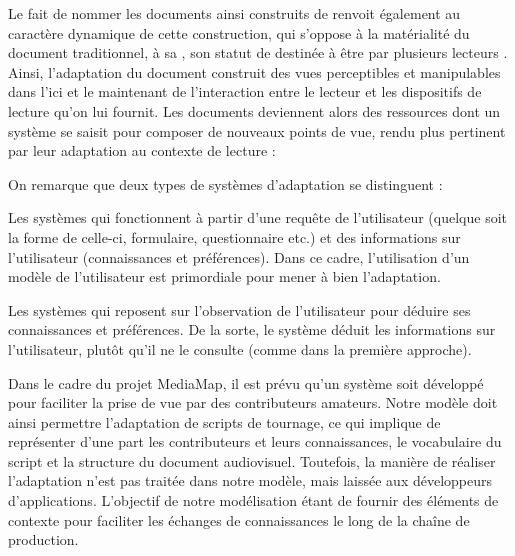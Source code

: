 Le fait de nommer les documents ainsi construits de  renvoit également au caractère dynamique de cette construction, qui s'oppose à la matérialité du document traditionnel, à sa , son statut de  destinée à être  par plusieurs lecteurs \cite[pp.185-186]{bachimont:icc}. 
Ainsi, l'adaptation du document construit des vues perceptibles et manipulables dans l'ici et le maintenant de l'interaction entre le lecteur et les dispositifs de lecture qu'on lui fournit.
Les documents deviennent alors des ressources dont un système se saisit pour composer de nouveaux points de vue, rendu plus pertinent par leur adaptation au contexte de lecture :

 


On remarque que deux types de systèmes d'adaptation se distinguent  : 
\begin{liste}
	\item Les systèmes  qui fonctionnent à partir d'une requête de l'utilisateur (quelque soit la forme de celle-ci, formulaire, questionnaire etc.) et des informations sur l'utilisateur (connaissances et préférences).
	Dans ce cadre, l'utilisation d'un modèle de l'utilisateur est primordiale pour mener à bien l'adaptation.
	\item Les systèmes  qui reposent sur l'observation de l'utilisateur pour déduire ses connaissances et préférences. 
	De la sorte, le système déduit les informations sur l'utilisateur, plutôt qu'il ne le consulte (comme dans la première approche).
\end{liste}

Dans le cadre du projet MediaMap, il est prévu qu'un système  soit développé pour faciliter la prise de vue par des contributeurs amateurs.
Notre modèle doit ainsi permettre l'adaptation de scripts de tournage, ce qui implique de représenter d'une part les contributeurs et leurs connaissances, le vocabulaire du script et la structure du document audiovisuel.
Toutefois, la manière de réaliser l'adaptation n'est pas traitée dans notre modèle, mais laissée aux développeurs d'applications.
L'objectif de notre modélisation étant de fournir des éléments de contexte pour faciliter les échanges de connaissances le long de la chaîne de production.

